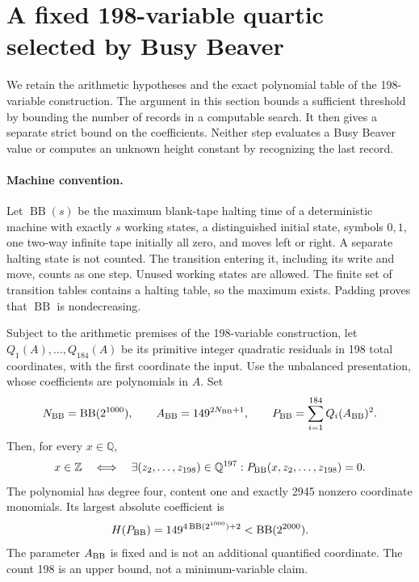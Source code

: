 \providecommand{\BB}{\operatorname{BB}}
\providecommand{\Q}{\mathbb Q}
\providecommand{\Z}{\mathbb Z}
\section{A fixed 198-variable quartic selected by Busy Beaver}
\label{q198bb:specialization}

We retain the arithmetic hypotheses and the exact polynomial table of
 the 198-variable construction. The argument in this section bounds a
sufficient threshold by bounding the number of records in a computable
search. It then gives a separate strict bound on the coefficients.
Neither step evaluates a Busy Beaver value or computes an unknown
height constant by recognizing the last record.

\paragraph{Machine convention.}
Let $\BB(s)$ be the maximum blank-tape halting time of a deterministic
machine with exactly $s$ working states, a distinguished initial state,
symbols $0,1$, one two-way infinite tape initially all zero, and moves
left or right. A separate halting state is not counted. The transition
entering it, including its write and move, counts as one step. Unused
working states are allowed. The finite set of transition tables contains
a halting table, so the maximum exists. Padding proves that $\BB$ is
nondecreasing.

\begin{theorem}\label{q198bb:fixed}
Subject to the arithmetic premises of the 198-variable construction,
let $Q_1(A),\ldots,Q_{184}(A)$ be its primitive integer quadratic
residuals in 198 total coordinates, with the first coordinate the input.
Use the unbalanced presentation, whose coefficients are polynomials in
$A$. Set
\[
 N_{\rm BB}=\BB(2^{1000}),\qquad
 A_{\rm BB}=149^{2N_{\rm BB}+1},\qquad
 P_{\rm BB}=\sum_{i=1}^{184}Q_i(A_{\rm BB})^2.
\]
Then, for every $x\in\Q$,
\[
 x\in\Z\quad\Longleftrightarrow\quad
 \exists(z_2,\ldots,z_{198})\in\Q^{197}:
 P_{\rm BB}(x,z_2,\ldots,z_{198})=0.
\]
The polynomial has degree four, content one and exactly 2945 nonzero
coordinate monomials. Its largest absolute coefficient is
\[
 H(P_{\rm BB})=149^{4\BB(2^{1000})+2}<\BB(2^{2000}).
\]
The parameter $A_{\rm BB}$ is fixed and is not an additional quantified
coordinate. The count 198 is an upper bound, not a minimum-variable claim.
\end{theorem}

